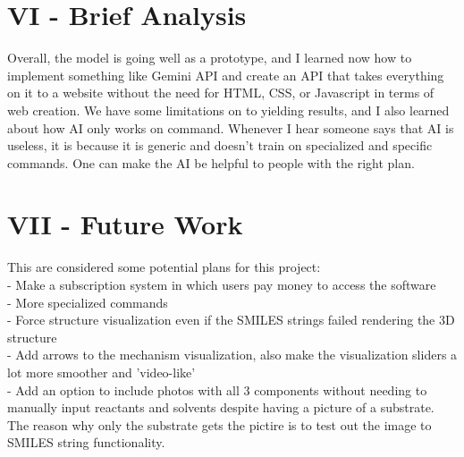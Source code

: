\documentclass{article}
\begin{document}
\section*{VI - Brief Analysis}
Overall, the model is going well as a prototype, and I learned now how to implement something like Gemini API and create an API that takes everything on it to a website without the need for HTML, CSS, or Javascript
in terms of web creation. We have some limitations on to yielding results, and I also learned about how AI only works on command. Whenever I hear someone says that AI is useless, it is because it is generic and doesn't 
train on specialized and specific commands. One can make the AI be helpful to people with the right plan. 
\\[2em]
\section*{VII - Future Work}
This are considered some potential plans for this project:
\\[2em]
- Make a subscription system in which users pay money to access the software
\\[1em]
- More specialized commands
\\[1em]
- Force structure visualization even if the SMILES strings failed rendering the 3D structure
\\[1em]
- Add arrows to the mechanism visualization, also make the visualization sliders a lot more smoother and 'video-like'
\\[1em]
- Add an option to include photos with all 3 components without needing to manually input reactants and solvents despite having a picture of a substrate. The reason why only the substrate gets the pictire is to test out the image to SMILES string functionality. 
\\[2em]
\end{document}
